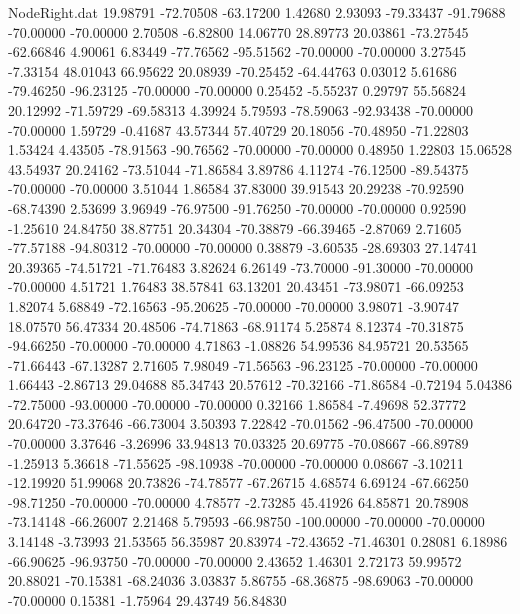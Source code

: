 \begin{filecontents}{NodeRight.dat}
  19.98791  -72.70508  -63.17200     1.42680    2.93093  -79.33437  -91.79688  -70.00000  -70.00000    2.70508   -6.82800   14.06770   28.89773
  20.03861  -73.27545  -62.66846     4.90061    6.83449  -77.76562  -95.51562  -70.00000  -70.00000    3.27545   -7.33154   48.01043   66.95622
  20.08939  -70.25452  -64.44763     0.03012    5.61686  -79.46250  -96.23125  -70.00000  -70.00000    0.25452   -5.55237    0.29797   55.56824
  20.12992  -71.59729  -69.58313     4.39924    5.79593  -78.59063  -92.93438  -70.00000  -70.00000    1.59729   -0.41687   43.57344   57.40729
  20.18056  -70.48950  -71.22803     1.53424    4.43505  -78.91563  -90.76562  -70.00000  -70.00000    0.48950    1.22803   15.06528   43.54937
  20.24162  -73.51044  -71.86584     3.89786    4.11274  -76.12500  -89.54375  -70.00000  -70.00000    3.51044    1.86584   37.83000   39.91543
  20.29238  -70.92590  -68.74390     2.53699    3.96949  -76.97500  -91.76250  -70.00000  -70.00000    0.92590   -1.25610   24.84750   38.87751
  20.34304  -70.38879  -66.39465    -2.87069    2.71605  -77.57188  -94.80312  -70.00000  -70.00000    0.38879   -3.60535  -28.69303   27.14741
  20.39365  -74.51721  -71.76483     3.82624    6.26149  -73.70000  -91.30000  -70.00000  -70.00000    4.51721    1.76483   38.57841   63.13201
  20.43451  -73.98071  -66.09253     1.82074    5.68849  -72.16563  -95.20625  -70.00000  -70.00000    3.98071   -3.90747   18.07570   56.47334
  20.48506  -74.71863  -68.91174     5.25874    8.12374  -70.31875  -94.66250  -70.00000  -70.00000    4.71863   -1.08826   54.99536   84.95721
  20.53565  -71.66443  -67.13287     2.71605    7.98049  -71.56563  -96.23125  -70.00000  -70.00000    1.66443   -2.86713   29.04688   85.34743
  20.57612  -70.32166  -71.86584    -0.72194    5.04386  -72.75000  -93.00000  -70.00000  -70.00000    0.32166    1.86584   -7.49698   52.37772
  20.64720  -73.37646  -66.73004     3.50393    7.22842  -70.01562  -96.47500  -70.00000  -70.00000    3.37646   -3.26996   33.94813   70.03325
  20.69775  -70.08667  -66.89789    -1.25913    5.36618  -71.55625  -98.10938  -70.00000  -70.00000    0.08667   -3.10211  -12.19920   51.99068
  20.73826  -74.78577  -67.26715     4.68574    6.69124  -67.66250  -98.71250  -70.00000  -70.00000    4.78577   -2.73285   45.41926   64.85871
  20.78908  -73.14148  -66.26007     2.21468    5.79593  -66.98750 -100.00000  -70.00000  -70.00000    3.14148   -3.73993   21.53565   56.35987
  20.83974  -72.43652  -71.46301     0.28081    6.18986  -66.90625  -96.93750  -70.00000  -70.00000    2.43652    1.46301    2.72173   59.99572
  20.88021  -70.15381  -68.24036     3.03837    5.86755  -68.36875  -98.69063  -70.00000  -70.00000    0.15381   -1.75964   29.43749   56.84830

\end{filecontents}
